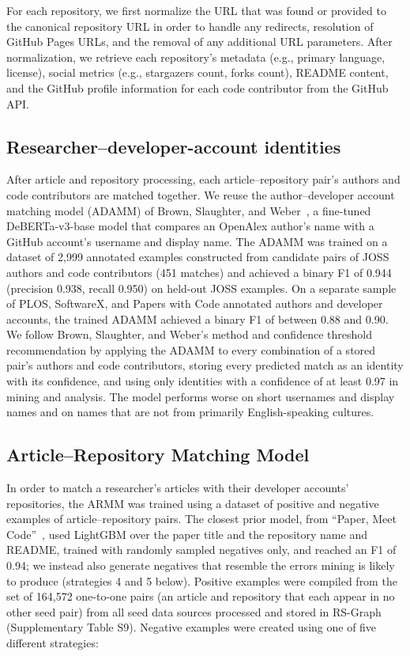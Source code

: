 \documentclass[pdflatex,sn-nature]{sn-jnl}%
\begin{document}
For each repository, we first normalize the URL that was found or provided to the canonical repository URL in order to handle any redirects, resolution of GitHub Pages URLs, and the removal of any additional URL parameters.
After normalization, we retrieve each repository's metadata (e.g., primary language, license), social metrics (e.g., stargazers count, forks count), README content, and the GitHub profile information for each code contributor from the GitHub API.

\subsection{Researcher--developer-account identities}\label{subsec:m-identities}

After article and repository processing, each article--repository pair's authors and code contributors are matched together.
We reuse the author--developer account matching model (ADAMM) of Brown, Slaughter, and Weber~\cite{brown2026code}, a fine-tuned DeBERTa-v3-base model that compares an OpenAlex author's name with a GitHub account's username and display name.
The ADAMM was trained on a dataset of 2,999 annotated examples constructed from candidate pairs of JOSS authors and code contributors (451 matches) and achieved a binary F1 of 0.944 (precision 0.938, recall 0.950) on held-out JOSS examples.
On a separate sample of PLOS, SoftwareX, and Papers with Code annotated authors and developer accounts, the trained ADAMM achieved a binary F1 of between 0.88 and 0.90.
We follow Brown, Slaughter, and Weber's method and confidence threshold recommendation by applying the ADAMM to every combination of a stored pair's authors and code contributors, storing every predicted match as an identity with its confidence, and using only identities with a confidence of at least 0.97 in mining and analysis.
The model performs worse on short usernames and display names and on names that are not from primarily English-speaking cultures.

\subsection{Article--Repository Matching Model}\label{subsec:m-armm}

In order to match a researcher's articles with their developer accounts' repositories, the ARMM was trained using a dataset of positive and negative examples of article--repository pairs.
The closest prior model, from ``Paper, Meet Code''~\cite{puangjaktha2024paper}, used LightGBM over the paper title and the repository name and README, trained with randomly sampled negatives only, and reached an F1 of 0.94; we instead also generate negatives that resemble the errors mining is likely to produce (strategies 4 and 5 below).
Positive examples were compiled from the set of 164,572 one-to-one pairs (an article and repository that each appear in no other seed pair) from all seed data sources processed and stored in RS-Graph (Supplementary Table S9).
Negative examples were created using one of five different strategies:
\end{document}
